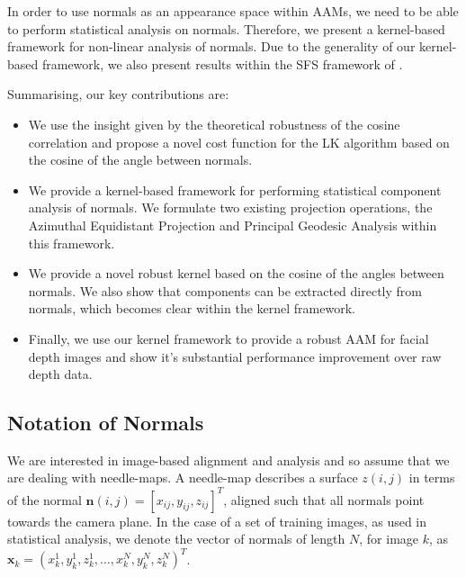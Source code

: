 In order to use normals as an appearance space within AAMs, we need to be able to perform statistical analysis on normals. Therefore, we present a kernel-based framework for non-linear analysis of normals. Due to the generality of our kernel-based framework, we also present results within the SFS framework of \cite{RefWorks:90}.

Summarising, our key contributions are:
\begin{itemize}
  \item We use the insight given by the theoretical robustness of the cosine correlation and propose a novel cost function for the LK algorithm based on the cosine of the angle between normals.
  \item We provide a kernel-based framework for performing statistical component analysis of normals. We formulate two existing projection operations, the Azimuthal Equidistant Projection \cite{RefWorks:90} and Principal Geodesic Analysis \cite{RefWorks:86} within this framework.
  \item We provide a novel robust kernel based on the cosine of the angles between normals. We also show that components can be extracted directly from normals, which becomes clear within the kernel framework.
  \item Finally, we use our kernel framework to provide a robust AAM for facial depth images and show it's substantial performance improvement over raw depth data.
\end{itemize}
\subsection{Notation of Normals}\label{subsec:notation-normals}
We are interested in image-based alignment and analysis and so assume that we are dealing with needle-maps. A needle-map describes a surface $z(i, j)$ in terms of the normal $\boldsymbol{n}(i, j) = [x_{ij}, y_{ij}, z_{ij}]^T$, aligned such that all normals point towards the camera plane. In the case of a set of training images, as used in statistical analysis, we denote the vector of normals of length $N$, for image $k$, as $\boldsymbol{x}_k = (x_k^1, y_k^1, z_k^1, \ldots, x_k^N, y_k^N, z_k^N)^T$.
